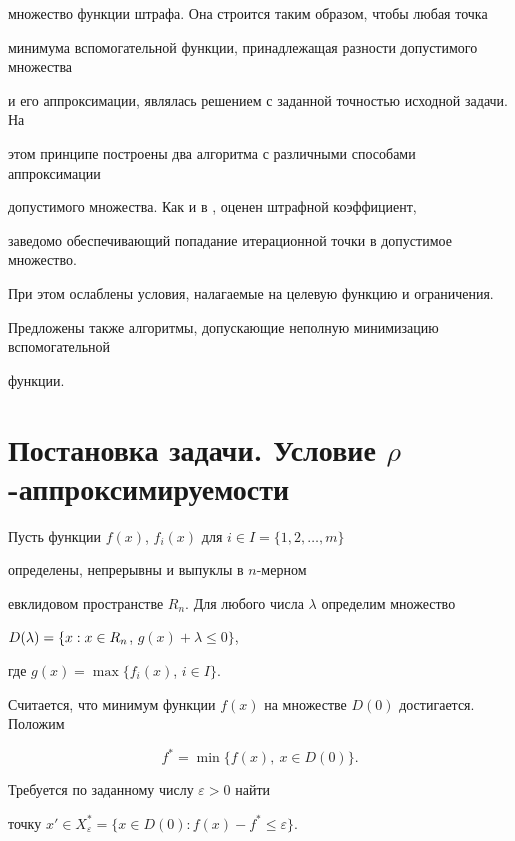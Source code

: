 множество функции штрафа. Она строится таким образом, чтобы любая точка


минимума вспомогательной функции, принадлежащая разности допустимого множества


и его аппроксимации, являлась решением с заданной точностью исходной задачи. На


этом принципе построены два алгоритма с различными способами аппроксимации


допустимого множества. Как и в \cite{Zab}, оценен штрафной коэффициент,


заведомо обеспечивающий попадание итерационной точки в допустимое множество.


При этом ослаблены условия, налагаемые на целевую функцию и ограничения.


Предложены также алгоритмы, допускающие неполную минимизацию вспомогательной


функции.








\section{Постановка задачи. Условие $\rho$-аппроксимируемости}





Пусть функции $f(x)$, $f_i(x)$ для $i\in I=\{1,2,\dotsc, m\}$ 


определены, непрерывны и выпуклы в $n$-мерном


евклидовом пространстве $R_n$. Для любого числа $\lambda$ определим множество


$D(\lambda)=\linebreak \{x: x\in R_n$, $g(x)+\lambda \leq 0\}$,


где $g(x)=\max\{f_i(x)$, $i\in I\}$.


Считается, что минимум функции $f(x)$ на множестве $D(0)$ достигается. Положим


\begin{equation}\label{Zad1}


f^*=\min\{f(x),\ x\in D(0)\}.


\end{equation}


Требуется по заданному числу $\varepsilon>0$ найти


точку $x'\in X^*_\varepsilon=\{x\in D(0): f(x)-f^*\leq\varepsilon\}$. 



